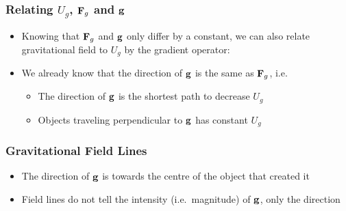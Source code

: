 \documentclass[12pt,compress,aspectratio=169]{beamer}
\newcommand{\mb}[1]{\ensuremath\mathbf{#1}}
\begin{document}
%
%
\begin{frame}
  \frametitle{Relating $U_g$, $\mb{F}_g$ and $\mb{g}$}
  \begin{itemize}
  \item Knowing that $\mb{F}_g$ and $\mb{g}$ only differ by a constant, we can
    also relate gravitational field to $U_g$ by the gradient operator:

    \vspace{-0.1in}{\Large
      \begin{displaymath}
        \mb{g}=\frac{\mb{F}_g}{m}=-\nabla\left(\frac{U_g}{m}\right)=
        -\frac{\partial}{\partial r}\left(\frac{U_g}{m}\right)
        \hat{\mb{r}}
      \end{displaymath}
    }
  \item We already know that the direction of $\mb{g}$ is the same as
    $\mb{F}_g$, i.e.\
    \begin{itemize}
    \item The direction of $\mb{g}$ is the shortest path to decrease $U_g$ 
    \item Objects traveling perpendicular to $\mb{g}$ has constant $U_g$
    \end{itemize}
  \end{itemize}
\end{frame}


\begin{frame}
  \frametitle{Gravitational Field Lines}
  \begin{center}
  \end{center}
  \begin{itemize}
  \item The direction of $\mb{g}$ is towards the centre of the object that
    created it
  \item Field lines do not tell the intensity (i.e.\ magnitude) of $\mb{g}$,
    only the direction
  \end{itemize}
\end{frame}
\end{document}
